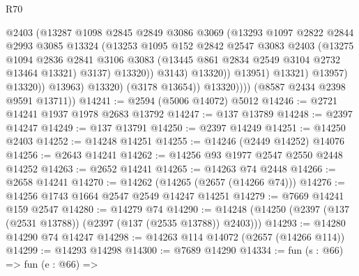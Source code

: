 \begin{lexlean}{R70}
\begin{coremodule}
                                  @2403
                                  (@13287
                                    @1098
                                    @2845
                                    @2849
                                    @3086
                                    @3069
                                    (@13293
                                      @1097
                                      @2822
                                      @2844
                                      @2993
                                      @3085
                                      @13324
                                      (@13253
                                        @1095
                                        @152
                                        @2842
                                        @2547
                                        @3083
                                        @2403
                                        (@13275
                                          @1094
                                          @2836
                                          @2841
                                          @3106
                                          @3083
                                          (@13445 @861 @2834 @2549 @3104 @2732 @13464 @13321)
                                          @3137)
                                        @13320))
                                    @3143)
                                  @13320))
                              @13951)
                            @13321)
                          @13957)
                        @13320))
                    @13963)
                  @13320)
                (@3178 @13654))
              @13320))))
      (@8587 @2434 @2398 @9591 @13711))
@14241 := @2594 (@5006 @14072) @5012
@14246 := @2721 @14241 @1937 @1978 @2683 @13792
@14247 := @137 @13789
@14248 := @2397 @14247
@14249 := @137 @13791
@14250 := @2397 @14249
@14251 := @14250 @2403
@14252 := @14248 @14251
@14255 := @14246 (@2449 @14252) @14076
@14256 := @2643 @14241
@14262 := @14256 @93 @1977 @2547 @2550 @2448 @14252
@14263 := @2652 @14241
@14265 := @14263 @74 @2448
@14266 := @2658 @14241
@14270 := @14262 (@14265 (@2657 (@14266 @74)))
@14276 := @14256 @1743 @1664 @2547 @2549 @14247 @14251
@14279 := @7669 @14241 @159 @2547
@14280 := @14279 @74
@14290 := @14248 (@14250 (@2397 (@137 (@2531 @13788)) (@2397 (@137 (@2535 @13788)) @2403)))
@14293 := @14280 @14290 @74 @14247
@14298 := @14263 @114 @14072 (@2657 (@14266 @114))
@14299 := @14293 @14298
@14300 := @7689 @14290
@14334 := fun (s : @66) =>
  fun (e : @66) =>

\end{coremodule}
\end{lexlean}
